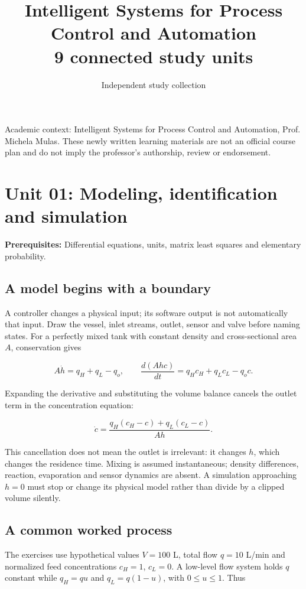\documentclass[11pt,a4paper]{article}
\title{Intelligent Systems for Process Control and Automation\\[4pt]{\large 9 connected study units}}
\author{Independent study collection}
\date{}
\begin{document}
\maketitle
\noindent Academic context: Intelligent Systems for Process Control and Automation, Prof. Michela Mulas. These newly written learning materials are not an official course plan and do not imply the professor's authorship, review or endorsement.

\tableofcontents\newpage
\clearpage\section{Unit 01: Modeling, identification and simulation}
\textbf{Prerequisites:} Differential equations, units, matrix least squares and elementary probability.


\subsection{A model begins with a boundary}

A controller changes a physical input; its software output is not automatically that input. Draw the vessel, inlet streams, outlet, sensor and valve before naming states. For a perfectly mixed tank with constant density and cross-sectional area $A$, conservation gives


\[A\dot h=q_H+q_L-q_o,\qquad \frac{d(Ahc)}{dt}=q_Hc_H+q_Lc_L-q_oc.\]

Expanding the derivative and substituting the volume balance cancels the outlet term in the concentration equation:


\[\dot c=\frac{q_H(c_H-c)+q_L(c_L-c)}{Ah}.\]

This cancellation does not mean the outlet is irrelevant: it changes $h$, which changes the residence time. Mixing is assumed instantaneous; density differences, reaction, evaporation and sensor dynamics are absent. A simulation approaching $h=0$ must stop or change its physical model rather than divide by a clipped volume silently.


\subsection{A common worked process}

The exercises use hypothetical values $V=100$ L, total flow $q=10$ L/min and normalized feed concentrations $c_H=1$, $c_L=0$. A low-level flow system holds $q$ constant while $q_H=qu$ and $q_L=q(1-u)$, with $0\leq u\leq1$. Thus
\end{document}
